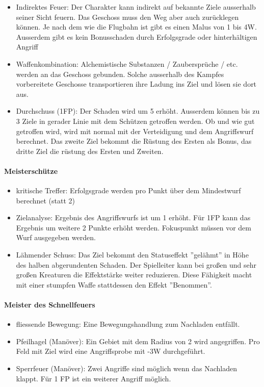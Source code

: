\documentclass{article}
\begin{document}
\begin{itemize}
\item Indirektes Feuer: Der Charakter kann indirekt auf bekannte Ziele ausserhalb seiner Sicht feuern. Das Geschoss muss den Weg aber auch zurücklegen können. Je nach dem wie die Flugbahn ist gibt es einen Malus von 1 bis 4W. Ausserdem gibt es kein Bonusschaden durch Erfolgsgrade oder hinterhältigen Angriff
\item Waffenkombination: Alchemistische Substanzen / Zaubersprüche / etc. werden an das Geschoss gebunden. Solche ausserhalb des Kampfes vorbereitete Geschosse transportieren ihre Ladung ins Ziel und lösen sie dort aus.
\item Durchschuss (1FP): Der Schaden wird um 5 erhöht. Ausserdem können bis zu 3 Ziele in gerader Linie mit dem Schützen getroffen werden. Ob und wie gut getroffen wird, wird mit normal mit der Verteidigung und dem Angriffswurf berechnet. Das zweite Ziel bekommt die Rüstung des Ersten als Bonus, das dritte Ziel die rüstung des Ersten und Zweiten.
\end{itemize}

\paragraph{Meisterschütze}

\begin{itemize}
\item kritische Treffer: Erfolgsgrade werden pro Punkt über dem Mindestwurf berechnet (statt 2)
\item Zielanalyse: Ergebnis des Angriffswurfs ist um 1 erhöht. Für 1FP kann das Ergebnis um weitere 2 Punkte erhöht werden. Fokuspunkt müssen vor dem Wurf ausgegeben werden.
\item Lähmender Schuss: Das Ziel bekommt den Statuseffekt ''gelähmt'' in Höhe des halben abgerundenten Schaden. Der Spielleiter kann bei großen und sehr großen Kreaturen die Effektstärke weiter reduzieren. Diese Fähigkeit macht mit einer stumpfen Waffe stattdessen den Effekt ''Benommen''.
\end{itemize}

\paragraph{Meister des Schnellfeuers}

\begin{itemize}
\item fliessende Bewegung: Eine Bewegungshandlung zum Nachladen entfällt.
\item Pfeilhagel (Manöver): Ein Gebiet mit dem Radius von 2 wird angegriffen. Pro Feld mit Ziel wird eine Angriffsprobe mit -3W durchgeführt.
\item Sperrfeuer (Manöver): Zwei Angriffe sind möglich wenn das Nachladen klappt. Für 1 FP ist ein weiterer Angriff möglich.
\end{itemize}
\end{document}
